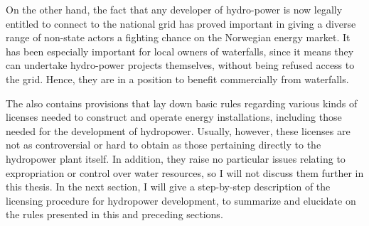 On the other hand, the fact that any developer of hydro-power is now legally entitled to connect to the national grid has proved important in giving a diverse range of non-state actors a fighting chance on the Norwegian energy market. It has been especially important for local owners of waterfalls, since it means they can undertake hydro-power projects themselves, without being refused access to the grid. Hence, they are in a position to benefit commercially from waterfalls.

The \cite{ea90} also contains provisions that lay down basic rules regarding various kinds of licenses needed to construct and operate energy installations, including those needed for the development of hydropower. Usually, however, these licenses are not as controversial or hard to obtain as those pertaining directly to the hydropower plant itself. In addition, they raise no particular issues relating to expropriation or control over water resources, so I will not discuss them further in this thesis.  In the next section, I will give a step-by-step description of the licensing procedure for hydropower development, to summarize and elucidate on the rules presented in this and preceding sections.

